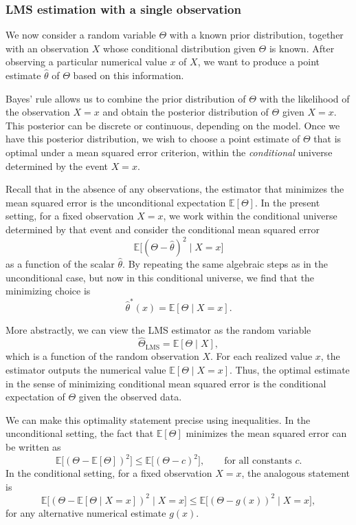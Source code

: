 \subsubsection{LMS estimation with a single observation}

We now consider a random variable \(\Theta\) with a known prior distribution, together with an observation \(X\) whose conditional distribution given \(\Theta\) is known.  
After observing a particular numerical value \(x\) of \(X\), we want to produce a point estimate \(\hat{\theta}\) of \(\Theta\) based on this information.

Bayes' rule allows us to combine the prior distribution of \(\Theta\) with the likelihood of the observation \(X = x\) and obtain the posterior distribution of \(\Theta\) given \(X = x\).  
This posterior can be discrete or continuous, depending on the model.  
Once we have this posterior distribution, we wish to choose a point estimate of \(\Theta\) that is optimal under a mean squared error criterion, within the \textit{conditional} universe determined by the event \(X = x\).

Recall that in the absence of any observations, the estimator that minimizes the mean squared error is the unconditional expectation \(\mathbb{E}[\Theta]\).  
In the present setting, for a fixed observation \(X = x\), we work within the conditional universe determined by that event and consider the conditional mean squared error
\[
\mathbb{E}\big[(\Theta - \hat{\theta})^{2} \mid X = x\big]
\]
as a function of the scalar \(\hat{\theta}\).  
By repeating the same algebraic steps as in the unconditional case, but now in this conditional universe, we find that the minimizing choice is
\[
\hat{\theta}^{\ast}(x)
=
\mathbb{E}[\Theta \mid X = x].
\]

More abstractly, we can view the LMS estimator as the random variable
\[
\hat{\Theta}_{\text{LMS}}
=
\mathbb{E}[\Theta \mid X],
\]
which is a function of the random observation \(X\).  
For each realized value \(x\), the estimator outputs the numerical value \(\mathbb{E}[\Theta \mid X = x]\).  
Thus, the optimal estimate in the sense of minimizing conditional mean squared error is the conditional expectation of \(\Theta\) given the observed data.

We can make this optimality statement precise using inequalities.  
In the unconditional setting, the fact that \(\mathbb{E}[\Theta]\) minimizes the mean squared error can be written as
\[
\mathbb{E}\big[(\Theta - \mathbb{E}[\Theta])^{2}\big]
\leq
\mathbb{E}\big[(\Theta - c)^{2}\big],
\qquad
\text{for all constants } c.
\]
In the conditional setting, for a fixed observation \(X = x\), the analogous statement is
\[
\mathbb{E}\big[(\Theta - \mathbb{E}[\Theta \mid X = x])^{2} \mid X = x\big]
\leq
\mathbb{E}\big[(\Theta - g(x))^{2} \mid X = x\big],
\]
for any alternative numerical estimate \(g(x)\).

